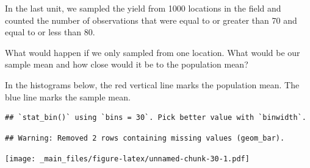 \documentclass[
]{book}
\newenvironment{Shaded}{\begin{snugshade}}{\end{snugshade}}
\newcommand{\AttributeTok}[1]{\textcolor[rgb]{0.77,0.63,0.00}{#1}}
\newcommand{\DecValTok}[1]{\textcolor[rgb]{0.00,0.00,0.81}{#1}}
\newcommand{\FunctionTok}[1]{\textcolor[rgb]{0.00,0.00,0.00}{#1}}
\newcommand{\NormalTok}[1]{#1}
\newcommand{\OtherTok}[1]{\textcolor[rgb]{0.56,0.35,0.01}{#1}}
\newcommand{\SpecialCharTok}[1]{\textcolor[rgb]{0.00,0.00,0.00}{#1}}
\newcommand{\StringTok}[1]{\textcolor[rgb]{0.31,0.60,0.02}{#1}}
\begin{document}
In the last unit, we sampled the yield from 1000 locations in the field
and counted the number of observations that were equal to or greater
than 70 and equal to or less than 80.

What would happen if we only sampled from one location. What would be
our sample mean and how close would it be to the population mean?

In the histograms below, the red vertical line marks the population
mean. The blue line marks the sample mean.

\begin{Shaded}
\end{Shaded}

\begin{verbatim}
## `stat_bin()` using `bins = 30`. Pick better value with `binwidth`.
\end{verbatim}

\begin{verbatim}
## Warning: Removed 2 rows containing missing values (geom_bar).
\end{verbatim}

\texttt{[image: \_main\_files/figure-latex/unnamed-chunk-30-1.pdf]}
\end{document}

